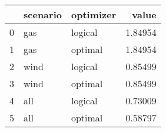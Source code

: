 \begin{tabular}{lllr}
\toprule
 & scenario & optimizer & value \\
\midrule
0 & gas & logical & 1.84954 \\
1 & gas & optimal & 1.84954 \\
2 & wind & logical & 0.85499 \\
3 & wind & optimal & 0.85499 \\
4 & all & logical & 0.73009 \\
5 & all & optimal & 0.58797 \\
\bottomrule
\end{tabular}
